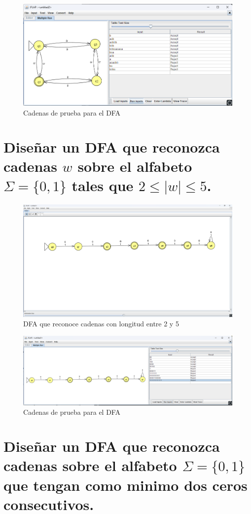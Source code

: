 \documentclass[11pt]{report}
\begin{document}
\begin{figure}[H]
  \centering
  \includegraphics[scale=0.65]{img/DFA_04_test.png}
  \caption{Cadenas de prueba para el DFA}
\end{figure}

\newpage

\section{Diseñar un DFA que reconozca cadenas $w$ sobre el alfabeto $\Sigma = \{0, 1\}$ tales que $2\leq |w| \leq 5$.}
\begin{figure}[H]
  \centering
  \includegraphics[scale=0.34]{img/DFA_05.png}
  \caption{DFA que reconoce cadenas con longitud entre 2 y 5}
\end{figure}

\begin{figure}[H]
  \centering
  \includegraphics[scale=0.45]{img/DFA_05_test.png}
  \caption{Cadenas de prueba para el DFA}
\end{figure}

\newpage

\section{Diseñar un DFA que reconozca cadenas sobre el alfabeto $\Sigma = \{0, 1\}$ que tengan como minimo dos ceros consecutivos.}
\end{document}
